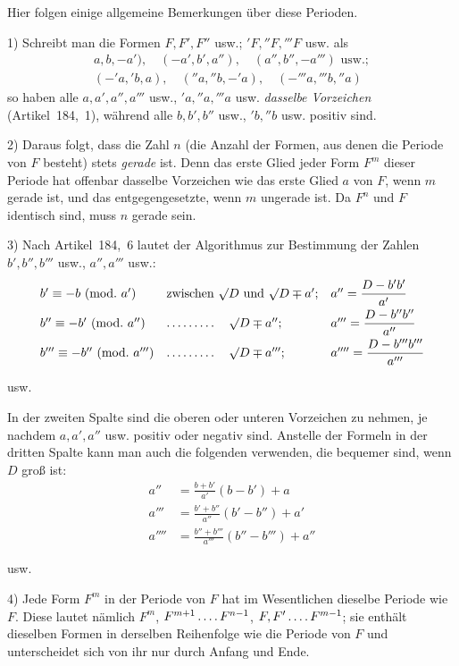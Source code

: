 Hier folgen einige allgemeine Bemerkungen über diese Perioden.

1) Schreibt man die Formen $F,F',F''$ usw.; ${}'F,{}''F,{}'''F$ usw. als
\[
\begin{gathered}
{a,b,-a')},\quad (-a',b',a''),\quad (a'',b'',-a''')\text{ usw.};\\
(-{}'a,{}'b,a),\quad ({}''a,{}''b,-{}'a),\quad (-{}'''a,{}'''b,{}''a)
\end{gathered}
\]
so haben alle $a,a',a'',a'''$ usw., ${}'a,{}''a,{}'''a$ usw. \textit{dasselbe Vorzeichen} (Artikel~184,~1), während alle $b,b',b''$ usw., ${}'b,{}''b$ usw. positiv sind.

2) Daraus folgt, dass die Zahl $n$ (die Anzahl der Formen, aus denen die Periode von $F$ besteht) stets \textit{gerade} ist. Denn das erste Glied jeder Form $F^m$ dieser Periode hat offenbar dasselbe Vorzeichen wie das erste Glied $a$ von $F$, wenn $m$ gerade ist, und das entgegengesetzte, wenn $m$ ungerade ist. Da $F^n$ und $F$ identisch sind, muss $n$ gerade sein.

3) Nach Artikel~184,~6 lautet der Algorithmus zur Bestimmung der Zahlen $b',b'',b'''$ usw., $a'',a'''$ usw.:
\[
\begin{array}{lll}
b'\equiv-b\ (\mathrm{mod.}\ a')&\text{zwischen }\surd D\text{ und }\surd D\mp a';&a''=\dfrac{D-b'b'}{a'}\\[6pt]
b''\equiv-b'\ (\mathrm{mod.}\ a'')&\mathinner{\ldotp\ldotp\ldotp\ldotp\ldotp\ldotp\ldotp\ldotp\ldotp}\quad\surd D\mp a'';&a'''=\dfrac{D-b''b''}{a''}\\[6pt]
b'''\equiv-b''\ (\mathrm{mod.}\ a''')&\mathinner{\ldotp\ldotp\ldotp\ldotp\ldotp\ldotp\ldotp\ldotp\ldotp}\quad\surd D\mp a''';&a''''=\dfrac{D-b'''b'''}{a'''}
\end{array}
\]
\centerline{usw.}
In der zweiten Spalte sind die oberen oder unteren Vorzeichen zu nehmen, je nachdem $a,a',a''$ usw. positiv oder negativ sind. Anstelle der Formeln in der dritten Spalte kann man auch die folgenden verwenden, die bequemer sind, wenn $D$ groß ist:
\[
\begin{aligned}
a''&=\frac{b+b'}{a'}(b-b')+a\\
a'''&=\frac{b'+b''}{a''}(b'-b'')+a'\\
a''''&=\frac{b''+b'''}{a'''}({b''}-b''')+a''
\end{aligned}
\]
\centerline{usw.}

4) Jede Form $F^m$ in der Periode von $F$ hat im Wesentlichen dieselbe Periode wie $F$. Diese lautet nämlich $F^m$, $F^{m+1}\mathinner{\ldotp\ldotp\ldotp\ldotp} F^{n-1}$, $F,F'\mathinner{\ldotp\ldotp\ldotp\ldotp} F^{m-1}$; sie enthält dieselben Formen in derselben Reihenfolge wie die Periode von $F$ und unterscheidet sich von ihr nur durch Anfang und Ende.

